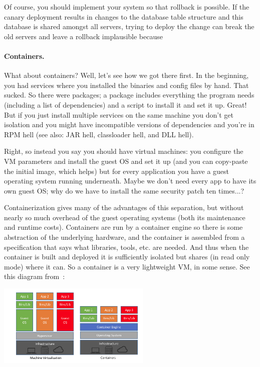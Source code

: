 \documentclass[a4paper]{report}
\begin{document}
Of course, you should implement your system so that rollback is possible. If the canary deployment results in changes to the database table structure and this database is shared amongst all servers, trying to deploy the change can break the old servers and leave a rollback implausible because 



\paragraph{Containers.} What about containers? Well, let's see how we got there first. In the beginning, you had services where you installed the binaries and config files by hand. That sucked. So there were packages; a package includes everything the program needs (including a list of dependencies) and a script to install it and set it up. Great! But if you just install multiple services on the same machine you don't get isolation and you might have incompatible versions of dependencies and you're in RPM hell (see also: JAR hell, classloader hell, and DLL hell).

Right, so instead you say you should have virtual machines: you configure the VM parameters and install the guest OS and set it up (and you can copy-paste the initial image, which helps) but for every application you have a guest operating system running underneath. Maybe we don't need every app to have its own guest OS; why do we have to install the same security patch ten times...?

Containerization gives many of the advantages of this separation, but without nearly so much overhead of the guest operating systems (both its maintenance and runtime costs). Containers are run by a container engine so there is some abstraction of the underlying hardware, and the container is assembled from a specification that says what libraries, tools, etc. are needed. And thus when the container is built and deployed it is sufficiently isolated but shares (in read only mode) where it can. So a container is a very lightweight VM, in some sense. See this diagram from~\cite{netappcontainer}:

\begin{center}
	\includegraphics[width=0.55\textwidth]{images/cvm.png}
\end{center}
\end{document}
